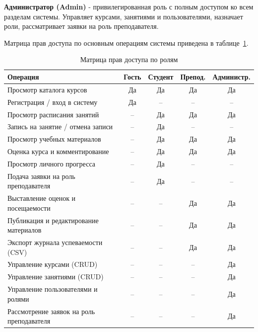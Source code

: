 \textbf{Администратор (Admin)} - привилегированная роль с полным доступом
ко всем разделам системы. Управляет курсами, занятиями и пользователями,
назначает роли, рассматривает заявки на роль преподавателя.

Матрица прав доступа по основным операциям системы приведена
в таблице~\ref{tab:roles}.

\begin{table}[ht!]
    \centering
    \caption{Матрица прав доступа по ролям}
    \label{tab:roles}
    \small
    \begin{tabularx}{\textwidth}{|X|c|c|c|c|}
        \hline
        \textbf{Операция} &
        \textbf{Гость} &
        \textbf{Студент} &
        \textbf{Препод.} &
        \textbf{Администр.} \\ \hline
        Просмотр каталога курсов                & Да  & Да  & Да  & Да  \\ \hline
        Регистрация / вход в систему            & Да  & --  & --  & --  \\ \hline
        Просмотр расписания занятий             & --  & Да  & Да  & Да  \\ \hline
        Запись на занятие / отмена записи       & --  & Да  & --  & --  \\ \hline
        Просмотр учебных материалов             & --  & Да  & Да  & Да  \\ \hline
        Оценка курса и комментирование          & --  & Да  & Да  & Да  \\ \hline
        Просмотр личного прогресса              & --  & Да  & --  & --  \\ \hline
        Подача заявки на роль преподавателя     & --  & Да  & --  & --  \\ \hline
        Выставление оценок и посещаемости       & --  & --  & Да  & Да  \\ \hline
        Публикация и редактирование материалов  & --  & --  & Да  & Да  \\ \hline
        Экспорт журнала успеваемости (CSV)      & --  & --  & Да  & Да  \\ \hline
        Управление курсами (CRUD)               & --  & --  & --  & Да  \\ \hline
        Управление занятиями (CRUD)             & --  & --  & --  & Да  \\ \hline
        Управление пользователями и ролями      & --  & --  & --  & Да  \\ \hline
        Рассмотрение заявок на роль преподавателя & -- & --  & --  & Да  \\ \hline
    \end{tabularx}
\end{table}

